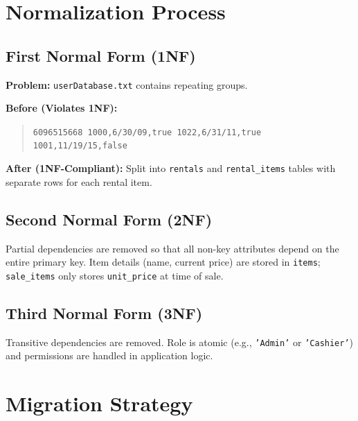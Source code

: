 \section{Normalization Process}

\subsection{First Normal Form (1NF)}

\textbf{Problem:} \texttt{userDatabase.txt} contains repeating groups.

\textbf{Before (Violates 1NF):}
\begin{quote}
\texttt{6096515668 1000,6/30/09,true 1022,6/31/11,true 1001,11/19/15,false}
\end{quote}

\textbf{After (1NF-Compliant):} Split into \texttt{rentals} and
\texttt{rental\_items} tables with separate rows for each rental item.

\subsection{Second Normal Form (2NF)}

Partial dependencies are removed so that all non-key attributes depend on
the entire primary key. Item details (name, current price) are stored in
\texttt{items}; \texttt{sale\_items} only stores \texttt{unit\_price} at
time of sale.

\subsection{Third Normal Form (3NF)}

Transitive dependencies are removed. Role is atomic (e.g., \texttt{'Admin'}
or \texttt{'Cashier'}) and permissions are handled in application logic.

\section{Migration Strategy}

